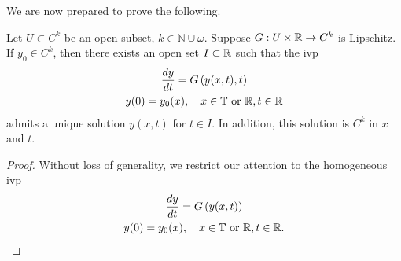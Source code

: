 %
%
We are now prepared to prove the following. 
\begin{theorem}
  Let $U \subset C^{k}$ be an open subset, $k \in \mathbb{N} \cup \omega$. Suppose $G: U \times \mathbb{R}
  \to C^{k}$
  is Lipschitz. If $y_{0} \in C^{k}$, then there exists an open set $I \subset
  \mathbb{R}$
such that the ivp 
\begin{gather}
\frac{dy}{dt} = G\left( y(x,t), t \right)
\\
y(0) = y_{0}(x), \quad x \in \mathbb{T} \ \text{or} \ \mathbb{R},t \in \mathbb{R}
\end{gather}
%
%
admits a unique solution $y(x,t)$ for $t \in I$. In addition,
this solution is $C^{k}$ in $x$ and $t$.
\label{thm:reg-result}
\end{theorem}
%
%
\begin{proof}
Without loss of generality, we restrict our attention to the homogeneous ivp
\begin{gather}
\frac{dy}{dt} = G\left( y(x,t) \right)
\label{cc}
\\
y(0) = y_{0}(x), \quad x \in \mathbb{T} \ \text{or} \ \mathbb{R},t \in \mathbb{R}.
\label{dd}
\end{gather}


\end{proof}
